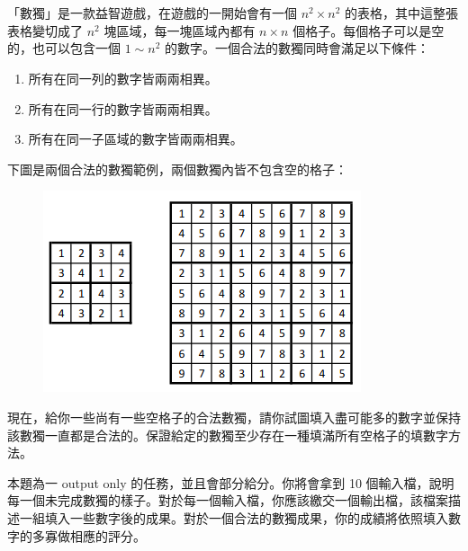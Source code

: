 



\section*{}

\subsection*{}

「數獨」是一款益智遊戲，在遊戲的一開始會有一個 $n^2\times n^2$ 的表格，其中這整張表格變切成了 $n^2$ 塊區域，每一塊區域內都有 $n\times n$ 個格子。每個格子可以是空的，也可以包含一個 $1\sim n^2$ 的數字。一個合法的數獨同時會滿足以下條件：

\begin{enumerate}
    \item 所有在同一列的數字皆兩兩相異。
    \item 所有在同一行的數字皆兩兩相異。
    \item 所有在同一子區域的數字皆兩兩相異。
\end{enumerate}

下圖是兩個合法的數獨範例，兩個數獨內皆不包含空的格子：

\begin{figure}[htp]
    \centering
    \includegraphics[width=0.5\linewidth]{board.png}
\end{figure}

現在，給你一些尚有一些空格子的合法數獨，請你試圖填入盡可能多的數字並保持該數獨一直都是合法的。保證給定的數獨至少存在一種填滿所有空格子的填數字方法。

本題為一 output only 的任務，並且會部分給分。你將會拿到 10 個輸入檔，說明每一個未完成數獨的樣子。對於每一個輸入檔，你應該繳交一個輸出檔，該檔案描述一組填入一些數字後的成果。對於一個合法的數獨成果，你的成績將依照填入數字的多寡做相應的評分。

\subsection*{}

